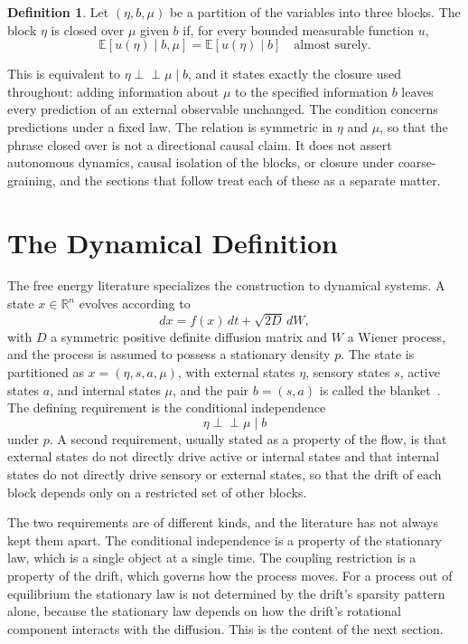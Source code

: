 \documentclass[11pt]{article}
\theoremstyle{definition}
\newtheorem{definition}{Definition}
\newcommand{\Ind}{\perp\!\!\!\perp}
\newcommand{\R}{\mathbb{R}}
\begin{document}
\begin{definition}
Let $(\eta,b,\mu)$ be a partition of the variables into three blocks. The block $\eta$ is closed over $\mu$ given $b$ if, for every bounded measurable function $u$,
\[
\mathbb E[u(\eta)\mid b,\mu]=\mathbb E[u(\eta)\mid b]\quad\text{almost surely.}
\]
\end{definition}

This is equivalent to $\eta\Ind\mu\mid b$, and it states exactly the closure used throughout: adding information about $\mu$ to the specified information $b$ leaves every prediction of an external observable unchanged. The condition concerns predictions under a fixed law. The relation is symmetric in $\eta$ and $\mu$, so that the phrase closed over is not a directional causal claim. It does not assert autonomous dynamics, causal isolation of the blocks, or closure under coarse-graining, and the sections that follow treat each of these as a separate matter.

\section{The Dynamical Definition}

The free energy literature specializes the construction to dynamical systems. A state $x\in\R^n$ evolves according to
\[
dx = f(x)\,dt + \sqrt{2D}\,dW,
\]
with $D$ a symmetric positive definite diffusion matrix and $W$ a Wiener process, and the process is assumed to possess a stationary density $p$. The state is partitioned as $x=(\eta,s,a,\mu)$, with external states $\eta$, sensory states $s$, active states $a$, and internal states $\mu$, and the pair $b=(s,a)$ is called the blanket~\cite{friston2019}. The defining requirement is the conditional independence
\[
\eta \Ind \mu \mid b
\]
under $p$. A second requirement, usually stated as a property of the flow, is that external states do not directly drive active or internal states and that internal states do not directly drive sensory or external states, so that the drift of each block depends only on a restricted set of other blocks.

The two requirements are of different kinds, and the literature has not always kept them apart. The conditional independence is a property of the stationary law, which is a single object at a single time. The coupling restriction is a property of the drift, which governs how the process moves. For a process out of equilibrium the stationary law is not determined by the drift's sparsity pattern alone, because the stationary law depends on how the drift's rotational component interacts with the diffusion. This is the content of the next section.
\end{document}
